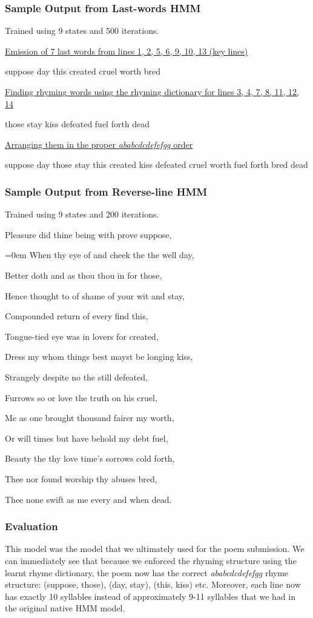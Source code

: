 \subsubsection*{Sample Output from Last-words HMM}
Trained using 9 states and 500 iterations.

\noindent\underline{Emission of 7 last words from lines 1, 2, 5, 6, 9, 10, 13 (key lines)}{\parskip=0pt\par suppose day this created cruel worth bred}

\noindent\underline{Finding rhyming words using the rhyming dictionary for lines 3, 4, 7, 8, 11, 12, 14}{\parskip=0pt\par those stay kiss defeated fuel forth dead}

\noindent\underline{Arranging them in the proper \textit{ababcdcdefefgg} order}{\parskip=0pt\par suppose
day those stay this created kiss defeated cruel worth fuel forth bred dead}

\subsubsection*{Sample Output from Reverse-line HMM}
Trained using 9 states and 200 iterations.


Pleasure did thine being with prove suppose,

{\parskip=0em 
When thy eye of and cheek the the well day,

Better doth and as thou thou in for those,

Hence thought to of shame of your wit and stay,

Compounded return of every find this,

Tongue-tied eye was in lovers for created,

Dress my whom things best mayst be longing kiss,

Strangely despite no the still defeated,

Furrows so or love the truth on his cruel,

Me as one brought thousand fairer my worth,

Or will times but have behold my debt fuel,

Beauty the thy love time's sorrows cold forth,

Thee nor found worship thy abuses bred,

Thee none swift as me every and when dead.
}

\subsubsection*{Evaluation}
This model was the model that we ultimately used for the poem submission. We can immediately see that because we enforced the rhyming structure using the learnt rhyme dictionary, the poem now has the correct \textit{ababcdcdefefgg} rhyme structure: (suppose, those), (day, stay), (this, kiss) etc. Moreover, each line now has exactly 10 syllables instead of approximately 9-11 syllables that we had in the original native HMM model. 

